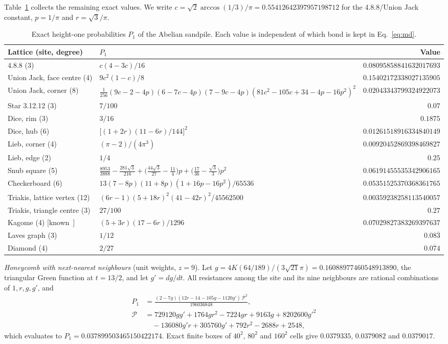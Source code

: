 \documentclass[aps,pre,10pt,twocolumn,superscriptaddress,nofootinbib]{revtex4-2}
\newcommand{\sq}{\sqrt{3}}
\begin{document}
Table~\ref{tab:p1} collects the remaining exact values. We write
$c=\sqrt2\arccos(1/3)/\pi=0.55412642397957198712$ for the 4.8.8/Union Jack constant, $p=1/\pi$ and
$r=\sq/\pi$.

\begin{table}
\caption{Exact height-one probabilities $P_1$ of the Abelian sandpile. Each value is independent
of which bond is kept in Eq.~\eqref{eq:md}.}
\label{tab:p1}
\begin{ruledtabular}
\begin{tabular}{llr}
Lattice (site, degree) & $P_1$ & Value\\
\hline
4.8.8 (3) & $c(4-3c)/16$ & $0.08095858841632017693$\\
Union Jack, face centre (4) & $9c^2(1-c)/8$ & $0.15402172338027135905$\\
Union Jack, corner (8) & $\tfrac1{256}(9c-2-4p)(6-7c-4p)(7-9c-4p)(81c^2-105c+34-4p-16p^2)^2$ & $0.02043343799324922073$\\
Star 3.12.12 (3) & $7/100$ & $0.07$\\
Dice, rim (3) & $3/16$ & $0.1875$\\
Dice, hub (6) & $\bigl[(1+2r)(11-6r)/144\bigr]^2$ & $0.01261518916334840149$\\
Lieb, corner (4) & $(\pi-2)/(4\pi^3)$ & $0.00920452869398469827$\\
Lieb, edge (2) & $1/4$ & $0.25$\\
Snub square (5) & $\tfrac{8953}{3888}-\tfrac{281\sq}{216}+\bigl(\tfrac{44\sq}{27}-\tfrac{11}4\bigr)p+\bigl(\tfrac{17}{36}-\tfrac{\sq}3\bigr)p^2$ & $0.06191455535342906165$\\
Checkerboard (6) & $13(7-8p)(11+8p)(1+16p-16p^2)/65536$ & $0.05351525370368361765$\\
Triakis, lattice vertex (12) & $(6r-1)(5+18r)^2(41-42r)^2/45562500$ & $0.00359238258113540057$\\
Triakis, triangle centre (3) & $27/100$ & $0.27$\\
Kagome (4) [known~\cite{Liu2026}] & $(5+3r)(17-6r)/1296$ & $0.07029827383269397637$\\
Laves graph (3) & $1/12$ & $0.08\overline{3}$\\
Diamond (4) & $2/27$ & $0.\overline{074}$\\
\end{tabular}
\end{ruledtabular}
\end{table}

\emph{Honeycomb with next-nearest neighbours} (unit weights, $z=9$). Let
$g=4K(64/189)/(3\sqrt{21}\pi)=0.16088977460548913890$, the triangular Green function at $t=13/2$,
and let $g'=dg/dt$. All resistances among the site and its nine neighbours are rational combinations
of $1,r,g,g'$, and
\begin{align}
P_1&=\frac{(2-7g)(12r-14-105g-1120g')\,\mathcal P^2}{196036848},\nonumber\\
\mathcal P&=729120gg'+1764gr^2-7224gr+9163g+8202600g'^2\nonumber\\
&\quad-136080g'r+305760g'+792r^2-2688r+2548,
\end{align}
which evaluates to $P_1=0.037899503465150422174$. Exact finite boxes of $40^2$, $80^2$ and $160^2$ cells give
$0.0379335$, $0.0379082$ and $0.0379017$.
\end{document}
